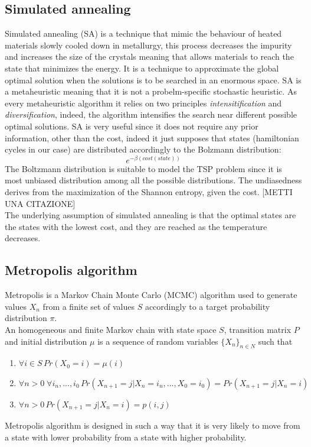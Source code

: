 \documentclass{article}
\begin{document}
\subsection{Simulated annealing}
Simulated annealing (SA) is a technique that mimic the behaviour of heated materials slowly cooled down in metallurgy, this process decreases the impurity and increases the size of the crystals meaning that allows materials to reach the state that minimizes the energy. It is a technique to approximate the global optimal solution when the solutions is to be searched in an enormous space. SA is a metaheuristic meaning that it is not a probelm-specific stochastic heuristic. As every metaheuristic algorithm it relies on two principles \textit{intensitification} and \textit{diversification}, indeed, the algorithm intensifies the search near different possible optimal solutions.
SA is very useful since it does not require any prior information, other than the cost, indeed it just supposes that states (hamiltonian cycles in our case) are distributed accordingly to the Bolzmann distribution:
\begin{equation}
e^{- \beta (cost(state))}
\end{equation}
The Boltzmann distribution is suitable to model the TSP problem since it is most unbiased distribution among all the possible distributions. The undiasedness derives from the maximization of the Shannon entropy, given the cost. [METTI UNA CITAZIONE]\\
The underlying assumption of simulated annealing is that the optimal states are the states with the lowest cost, and they are reached as the temperature decreases.

\subsection{Metropolis algorithm}
Metropolis is a Markov Chain Monte Carlo (MCMC) algorithm used to generate values $X_n$ from a finite set of values $S$ accordingly to a target probability distribution $\pi$.  \\
An homogeneous and finite Markov chain with state space $S$, transition matrix $P$ and initial distribution $\mu$ is a sequence of random variables $\{ X_n \}_{n \in N}$ such that
\begin{enumerate}
\item $\forall i \in S \, Pr(X_0=i)= \mu(i)$ 
\item $\forall n > 0 \; \forall i_n,...,i_0 \,  Pr(X_{n+1} = j | X_n = i_n,..., X_0=i_0) = Pr(X_{n+1} = j | X_n = i)$
\item $\forall n > 0 \, Pr(X_{n+1} = j | X_n = i) = p(i,j) $
\end{enumerate}
Metropolis algorithm is designed in such a way that it is very likely to move from a state with lower probability from a state with higher probability. \\
\end{document}
